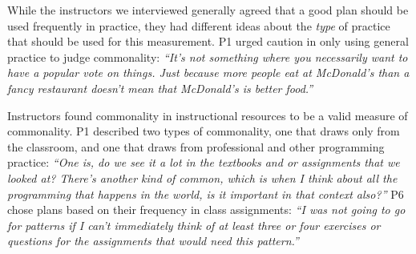 





While the instructors we interviewed generally agreed that a good plan should be used frequently in practice, they had different ideas about the \textit{type} of practice that should be used for this measurement. %
P1 urged caution in only using general practice to judge commonality:
\textit{``It's not something where you necessarily want to have a popular vote on things. Just because more people eat at McDonald's than a fancy restaurant doesn't mean that McDonald's is better food.''} 


Instructors found commonality in instructional resources to be a valid measure of commonality. P1 described two types of commonality, one that draws only from the classroom, and one that draws from professional and other programming practice: \textit{``One is, do we see it a lot in the textbooks and or assignments that we looked at? There's another kind of common, which is when I think about all the programming that happens in the world, is it important in that context also?''} 
P6 chose plans based on their frequency in class assignments: \textit{``I was not going to go for patterns if I can't immediately think of at least three or four exercises or questions for the assignments that would need this pattern.''}

